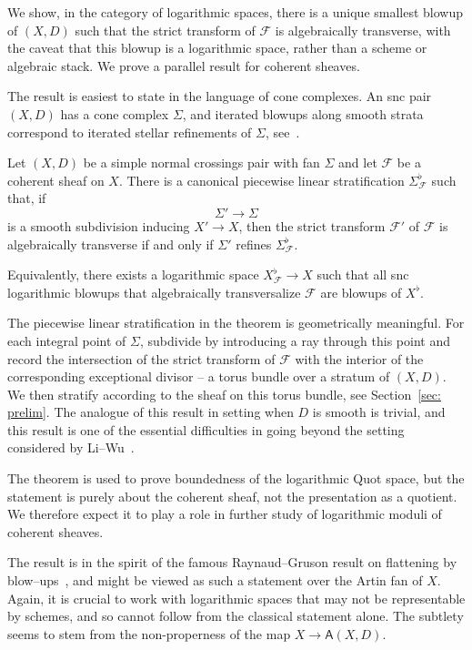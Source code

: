 \documentclass[11pt]{amsart}
\theoremstyle{definition}
\newenvironment{customthm}[1]
{\renewcommand\theinnercustomthm{#1}\innercustomthm}
{\endinnercustomthm}
\theoremstyle{definition}
\begin{document}
We show, in the category of logarithmic spaces, there is a unique smallest blowup of $(X,D)$ such that the strict transform of $\mathcal F$ is algebraically transverse, with the caveat that this blowup is a logarithmic space, rather than a scheme or algebraic stack. We prove a parallel result for coherent sheaves. 

The result is easiest to state in the language of cone complexes. An snc pair $(X,D)$ has a cone complex $\Sigma$, and iterated blowups along smooth strata correspond to iterated stellar refinements of $\Sigma$, see~\cite{KKMSD}.

\begin{customthm}{B}[Canonical transversalization]\label{thm: canonical-transversalization}
Let $(X,D)$ be a simple normal crossings pair with fan $\Sigma$ and let $\mathcal F$ be a coherent sheaf on $X$. There is a canonical piecewise linear stratification $\Sigma^\flat_{\mathcal F}$ such that, if 
\[
\Sigma'\to \Sigma
\]
is a smooth subdivision inducing $X'\to X$, then the strict transform $\mathcal F'$ of $\mathcal F$ is algebraically transverse if and only if $\Sigma'$ refines $\Sigma^\flat_{\mathcal F}$. 
\end{customthm}

Equivalently, there exists a logarithmic space $X^\flat_{\mathcal F}\to X$ such that all snc logarithmic blowups that algebraically transversalize $\mathcal F$ are blowups of $X^\flat$. 

The piecewise linear stratification in the theorem is geometrically meaningful. For each integral point of $\Sigma$, subdivide by introducing a ray through this point and record the intersection of the strict transform of $\mathcal F$ with the interior of the corresponding exceptional divisor -- a torus bundle over a stratum of $(X,D)$. We then stratify according to the sheaf on this torus bundle, see Section~\ref{sec: prelim}. The analogue of this result in setting when $D$ is smooth is trivial, and this result is one of the essential difficulties in going beyond the setting considered by Li--Wu~\cite{LiWu}.

The theorem is used to prove boundedness of the logarithmic Quot space, but the statement is purely about the coherent sheaf, not the presentation as a quotient. We therefore expect it to play a role in further study of logarithmic moduli of coherent sheaves. 

The result is in the spirit of the famous Raynaud--Gruson result on flattening by blow--ups~\cite{RG71}, and might be viewed as such a statement over the Artin fan of $X$. Again, it is crucial to work with logarithmic spaces that may not be representable by schemes, and so cannot follow from the classical statement alone. The subtlety seems to stem from the non-properness of the map $X\to\mathsf A(X,D)$.
\end{document}
